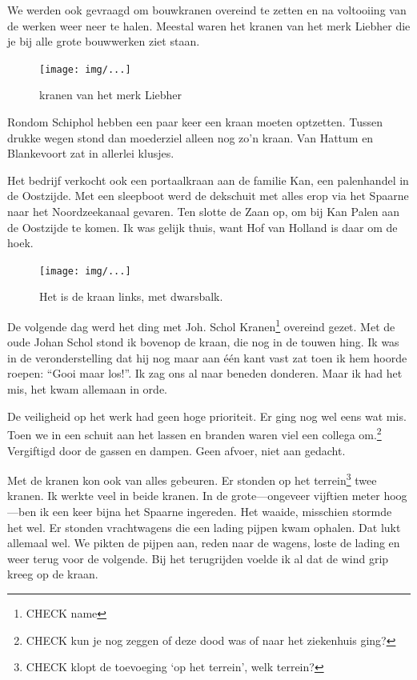 \documentclass[12pt,twoside]{memoir}
\begin{document}
We werden ook gevraagd om bouwkranen overeind te zetten en na voltooiing van de werken weer neer te halen. Meestal waren het kranen van het merk Liebher die je bij alle grote bouwwerken ziet staan. 

\begin{figure}[t]
\texttt{[image: img/...]}
\caption{kranen van het merk Liebher}
\end{figure}

Rondom Schiphol hebben een paar keer een kraan moeten optzetten. Tussen drukke wegen stond dan moederziel alleen nog zo’n kraan. Van Hattum en Blankevoort zat in allerlei klusjes.

Het bedrijf verkocht ook een portaalkraan aan de familie Kan, een palenhandel in de Oostzijde. Met een sleepboot werd de dekschuit met alles erop via het Spaarne naar het Noordzeekanaal gevaren. Ten slotte de Zaan op, om bij Kan Palen aan de Oostzijde te komen. Ik was gelijk thuis, want Hof van Holland is daar om de hoek. 

\begin{figure}[t]
\texttt{[image: img/...]}
\caption{Het is de kraan links, met dwarsbalk.}
\end{figure}

De volgende dag werd het ding met Joh. Schol Kranen\footnote{CHECK name} overeind gezet. Met de oude Johan Schol stond ik bovenop de kraan, die nog in de touwen hing. Ik was in de veronderstelling dat hij nog maar aan één kant vast zat toen ik hem hoorde roepen: ``Gooi maar los!''. Ik zag ons al naar beneden donderen. Maar ik had het mis, het kwam allemaan in orde. 

De veiligheid op het werk had geen hoge prioriteit. Er ging nog wel eens wat mis. Toen we in een schuit aan het lassen en branden waren viel een collega om.\footnote{CHECK kun je nog zeggen of deze dood was of naar het ziekenhuis ging?} Vergiftigd door de gassen en dampen. Geen afvoer, niet aan gedacht. 

Met de kranen kon ook van alles gebeuren. Er stonden op het terrein\footnote{CHECK klopt de toevoeging `op het terrein', welk terrein?} twee kranen. Ik werkte veel in beide kranen. In de grote---ongeveer vijftien meter hoog---ben ik een keer bijna het Spaarne ingereden. Het waaide, misschien stormde het wel. Er stonden vrachtwagens die een lading pijpen kwam ophalen. Dat lukt allemaal wel. We pikten de pijpen aan, reden naar de wagens, loste de lading en weer terug voor de volgende. Bij het terugrijden voelde ik al dat de wind grip kreeg op de kraan. 
\end{document}
